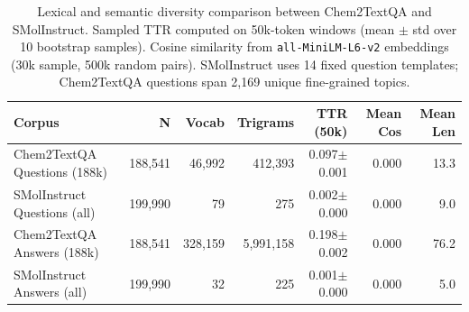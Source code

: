 \begin{table}[t]
\centering
\caption{Lexical and semantic diversity comparison between Chem2TextQA and SMolInstruct.
Sampled TTR computed on 50k-token windows (mean $\pm$ std over 10 bootstrap samples).
Cosine similarity from \texttt{all-MiniLM-L6-v2} embeddings (30k sample, 500k random pairs).
SMolInstruct uses 14 fixed question templates; Chem2TextQA questions span 2,169 unique
fine-grained topics.}
\label{tab:chem_diversity}
\small
\begin{tabular}{lrrrrrr}
\toprule
\textbf{Corpus} & \textbf{N} & \textbf{Vocab} & \textbf{Trigrams}
  & \textbf{TTR (50k)} & \textbf{Mean Cos} & \textbf{Mean Len} \\
\midrule
Chem2TextQA Questions (188k) & 188,541 & 46,992 & 412,393 & 0.097$\pm$0.001 & 0.000 & 13.3 \\
SMolInstruct Questions (all) & 199,990 & 79 & 275 & 0.002$\pm$0.000 & 0.000 & 9.0 \\
Chem2TextQA Answers (188k) & 188,541 & 328,159 & 5,991,158 & 0.198$\pm$0.002 & 0.000 & 76.2 \\
SMolInstruct Answers (all) & 199,990 & 32 & 225 & 0.001$\pm$0.000 & 0.000 & 5.0 \\
\bottomrule
\end{tabular}
\end{table}
